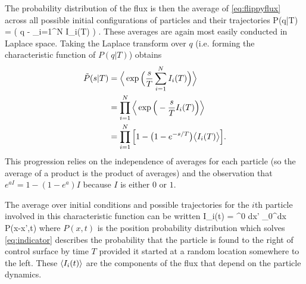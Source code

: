 The probability distribution of the flux is then the average of \DIFdelbegin {}\DIFdelend \DIFaddbegin {}\DIFaddend \ref{eq:flippyflux} across all possible initial configurations of particles and their trajectories
\be P(q|T) = \Big \bra \delta\Big( q - \sum_{i=1}^N I_i(T) \Big) \Big\ket. \ee
These averages are again most easily conducted in Laplace space. 
Taking the Laplace transform over $q$ (i.e. forming the characteristic function of $P(q|T)$) obtains
\DIFdelbegin %
\DIFdelend \DIFaddbegin \begin{align} 
\begin{split}
\tilde{P}(s|T) &=  \Big\langle \exp\Big(\frac{s}{T}\sum_{i=1}^N I_i(T)\Big)\Big\rangle \\
	&=  \prod_{i=1}^N \Big\langle \exp\Big(-\frac{s}{T}I_i(T)\Big)\Big\rangle \\
	&= \prod_{i=1}^N \Big[1-\big(1-e^{-s/T}\big)\big\langle I_i(T) \big\rangle \Big].
\end{split}
\label{eq:flippycharacteristic}
\end{align}\DIFaddend 
This progression relies on the independence of averages for each particle (so the average of a product is the product of averages) and the observation that  $e^{a I} = 1-(1-e^a)I$ because $I$ is either $0$ or $1$.

The average over initial conditions and possible trajectories for the $i$th particle involved in this characteristic function can be written
\be \bra I_i(t) \ket = \int\DIFdelbegin {}\DIFdelend \DIFaddbegin {}\DIFaddend ^0 dx' \int_0^\infty dx P(x-x',t)\DIFaddbegin \DIFadd{, }\DIFaddend \label{eq:indicator} \ee
where $P(x,t)$ is the position probability distribution which solves \DIFdelbegin {}\DIFdelend \DIFaddbegin {}\DIFaddend \ref{eq:indicator} describes the probability that the \DIFdelbegin {}\DIFdelend \DIFaddbegin {}\DIFaddend particle is found to the right of control surface by time $T$ provided it started at a random location somewhere to the left.
These $\langle I_i(t) \rangle$ are the components of the flux that depend on the particle dynamics. 

